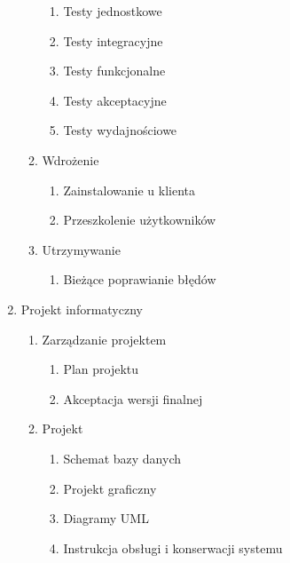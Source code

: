 \begin{enumerate}
\begin{enumerate}
\begin{enumerate}
\item Testy jednostkowe
\item Testy integracyjne
\item Testy funkcjonalne
\item Testy akceptacyjne
\item Testy wydajnościowe

\end{enumerate}
\item Wdrożenie

\begin{enumerate}

\item Zainstalowanie u klienta
\item Przeszkolenie użytkowników

\end{enumerate}
\item Utrzymywanie

\begin{enumerate}

\item Bieżące poprawianie błędów

\end{enumerate}
\end{enumerate}


\item Projekt informatyczny

\begin{enumerate}

\item Zarządzanie projektem

\begin{enumerate}

\item Plan projektu
\item Akceptacja wersji finalnej

\end{enumerate}

\item Projekt

\begin{enumerate}

\item Schemat bazy danych
\item Projekt graficzny
\item Diagramy UML
\item Instrukcja obsługi i konserwacji systemu

\end{enumerate}


\end{enumerate}
\end{enumerate}
